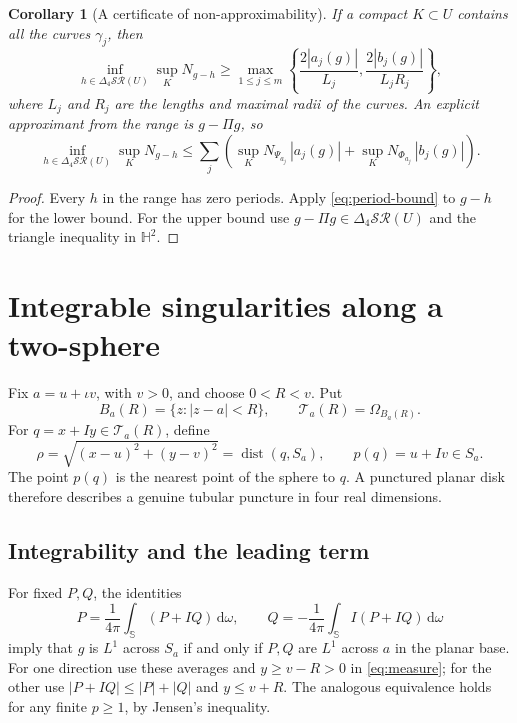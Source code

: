 \documentclass[11pt,a4paper]{article}
\numberwithin{equation}{section}
\newtheorem{corollary}[theorem]{Corollary}
\theoremstyle{definition}
\theoremstyle{remark}
\newcommand{\HH}{\mathbb H}
\newcommand{\SSS}{\mathbb S}
\newcommand{\SR}{\mathcal{SR}}
\newcommand{\lap}{\Delta_4}
\newcommand{\dd}{\,\mathrm d}
\newcommand{\dist}{\operatorname{dist}}
\begin{document}
\begin{corollary}[A certificate of non-approximability]\label{cor:distance}
If a compact $K\subset U$ contains all the curves $\gamma_j$, then
\begin{equation}\label{eq:distance}
 \inf_{h\in\lap\SR(U)}\sup_K N_{g-h}
 \ge \max_{1\le j\le m}
 \left\{\frac{2|a_j(g)|}{L_j},
        \frac{2|b_j(g)|}{L_jR_j}\right\},
\end{equation}
where $L_j$ and $R_j$ are the lengths and maximal radii of the curves.
An explicit approximant from the range is $g-\Pi g$, so
\begin{equation}\label{eq:distance-upper}
 \inf_{h\in\lap\SR(U)}\sup_K N_{g-h}
 \le \sum_j\left(
  \sup_K N_{\Psi_{a_j}}\,|a_j(g)|+
  \sup_K N_{\Phi_{a_j}}\,|b_j(g)|\right).
\end{equation}
\end{corollary}
\begin{proof}
Every $h$ in the range has zero periods. Apply \eqref{eq:period-bound}
to $g-h$ for the lower bound. For the upper bound use
$g-\Pi g\in\lap\SR(U)$ and the triangle inequality in $\HH^2$.
\end{proof}

\section{Integrable singularities along a two-sphere}
\label{sec:singularities}

Fix $a=u+\iota v$, with $v>0$, and choose $0<R<v$. Put
\[
 B_a(R)=\{z:|z-a|<R\},\qquad
 \mathcal T_a(R)=\Omega_{B_a(R)}.
\]
For $q=x+Iy\in\mathcal T_a(R)$, define
\begin{equation}\label{eq:rho}
 \rho=\sqrt{(x-u)^2+(y-v)^2}=\dist(q,S_a),\qquad
 p(q)=u+Iv\in S_a.
\end{equation}
The point $p(q)$ is the nearest point of the sphere to $q$. A punctured
planar disk therefore describes a genuine tubular puncture in four real
dimensions.

\subsection{Integrability and the leading term}
For fixed $P,Q$, the identities
\[
 P=\frac1{4\pi}\int_{\SSS}(P+IQ)\dd\omega,
 \qquad Q=-\frac1{4\pi}\int_{\SSS}I(P+IQ)\dd\omega
\]
imply that $g$ is $L^1$ across $S_a$ if and only if $P,Q$ are $L^1$
across $a$ in the planar base. For one direction use these averages and
$y\ge v-R>0$ in \eqref{eq:measure}; for the other use
$|P+IQ|\le|P|+|Q|$ and $y\le v+R$. The analogous equivalence holds for
any finite $p\ge1$, by Jensen's inequality.
\end{document}
